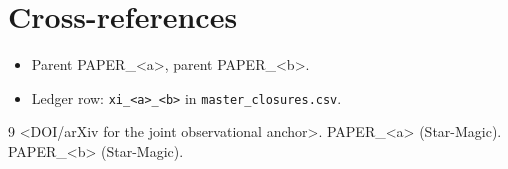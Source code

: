 \documentclass[11pt]{article}
\begin{document}
\section{Cross-references}
\begin{itemize}
  \item Parent PAPER\_<a>, parent PAPER\_<b>.
  \item Ledger row: \texttt{xi\_<a>\_<b>} in \texttt{master\_closures.csv}.
\end{itemize}


\begin{thebibliography}{9}
 <DOI/arXiv for the joint observational anchor>.
 PAPER\_<a> (Star-Magic).
 PAPER\_<b> (Star-Magic).
\end{thebibliography}
\end{document}
